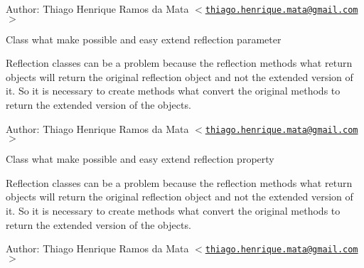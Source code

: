 \begin{Desc}
\item[Author:]Thiago Henrique Ramos da Mata $<$\href{mailto:thiago.henrique.mata@gmail.com}{\tt thiago.henrique.mata@gmail.com}$>$\end{Desc}
Class what make possible and easy extend reflection parameter

Reflection classes can be a problem because the reflection methods what return objects will return the original reflection object and not the extended version of it. So it is necessary to create methods what convert the original methods to return the extended version of the objects.

\begin{Desc}
\item[Author:]Thiago Henrique Ramos da Mata $<$\href{mailto:thiago.henrique.mata@gmail.com}{\tt thiago.henrique.mata@gmail.com}$>$\end{Desc}
Class what make possible and easy extend reflection property

Reflection classes can be a problem because the reflection methods what return objects will return the original reflection object and not the extended version of it. So it is necessary to create methods what convert the original methods to return the extended version of the objects.

\begin{Desc}
\item[Author:]Thiago Henrique Ramos da Mata $<$\href{mailto:thiago.henrique.mata@gmail.com}{\tt thiago.henrique.mata@gmail.com}$>$ \end{Desc}


